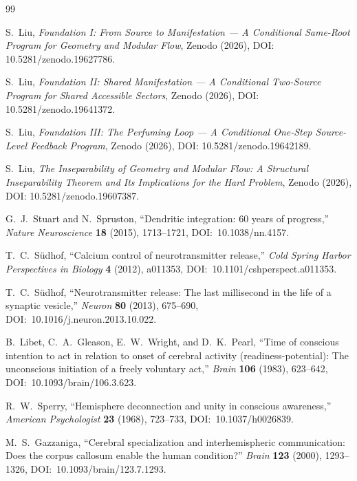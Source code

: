 \documentclass[12pt]{article}
\theoremstyle{definition}
\theoremstyle{remark}
\begin{document}
\begin{thebibliography}{99}
\sloppy
\raggedright

S.~Liu, \emph{Foundation I: From Source to Manifestation --- A Conditional Same-Root Program for Geometry and Modular Flow}, Zenodo (2026), DOI: 10.5281/zenodo.19627786.

S.~Liu, \emph{Foundation II: Shared Manifestation --- A Conditional Two-Source Program for Shared Accessible Sectors}, Zenodo (2026), DOI: 10.5281/zenodo.19641372.

S.~Liu, \emph{Foundation III: The Perfuming Loop --- A Conditional One-Step Source-Level Feedback Program}, Zenodo (2026), DOI: 10.5281/zenodo.19642189.

S.~Liu, \emph{The Inseparability of Geometry and Modular Flow: A Structural Inseparability Theorem and Its Implications for the Hard Problem}, Zenodo (2026), DOI: 10.5281/zenodo.19607387.

G.~J.~Stuart and N.~Spruston,
``Dendritic integration: 60 years of progress,''
\emph{Nature Neuroscience} \textbf{18} (2015), 1713--1721,
DOI:~10.1038/nn.4157.

T.~C.~S{\"u}dhof,
``Calcium control of neurotransmitter release,''
\emph{Cold Spring Harbor Perspectives in Biology} \textbf{4} (2012),
a011353,
DOI:~10.1101/cshperspect.a011353.

T.~C.~S{\"u}dhof,
``Neurotransmitter release: The last millisecond in the life of a
synaptic vesicle,''
\emph{Neuron} \textbf{80} (2013), 675--690,
DOI:~10.1016/j.neuron.2013.10.022.

B.~Libet, C.~A.~Gleason, E.~W.~Wright, and D.~K.~Pearl,
``Time of conscious intention to act in relation to onset of cerebral
activity (readiness-potential): The unconscious initiation of a freely
voluntary act,''
\emph{Brain} \textbf{106} (1983), 623--642,
DOI:~10.1093/brain/106.3.623.

R.~W.~Sperry,
``Hemisphere deconnection and unity in conscious awareness,''
\emph{American Psychologist} \textbf{23} (1968), 723--733,
DOI:~10.1037/h0026839.

M.~S.~Gazzaniga,
``Cerebral specialization and interhemispheric communication: Does the
corpus callosum enable the human condition?''
\emph{Brain} \textbf{123} (2000), 1293--1326,
DOI:~10.1093/brain/123.7.1293.


\end{thebibliography}
\end{document}
